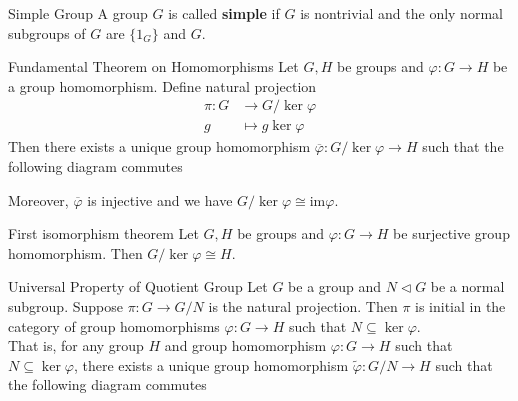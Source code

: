 \begin{definition}{Simple Group}{}
    A group $G$ is called \textbf{simple} if $G$ is nontrivial and the only normal subgroups of $G$ are $\{1_G\}$ and $G$.
\end{definition}

\begin{theorem}{Fundamental Theorem on Homomorphisms}{}
    Let $G,H$ be groups and $\varphi:G\to H$ be a group homomorphism. Define natural projection
    \begin{align*}
        \pi:G & \longrightarrow G/\ker\varphi \\
        g     & \longmapsto g\ker\varphi
    \end{align*}
    Then there exists a unique group homomorphism $\overline{\varphi}:G/\ker\varphi\to H$ such that the following diagram commutes
    \begin{center}
    \end{center}
    Moreover, $\overline{\varphi}$ is injective and we have $ G/\ker\varphi\cong \mathrm{im}\varphi$.
\end{theorem}

\begin{corollary}{First isomorphism theorem}{}
    Let $G,H$ be groups and $\varphi:G\to H$ be surjective group homomorphism. Then $G/\ker\varphi\cong H$.
\end{corollary}


\begin{proposition}{Universal Property of Quotient Group}{}
    Let $G$ be a group and $N \lhd G$ be a normal subgroup. Suppose $\pi:G\to G/N$ is the natural projection. Then $\pi$ is initial in the category of group homomorphisms $\varphi:G\to H$ such that $N\subseteq \ker\varphi$. \\
    That is, for any group $H$ and group homomorphism $\varphi:G\to H$ such that $N\subseteq \ker\varphi$, there exists a unique group homomorphism $\widetilde{\varphi}:G/N\to H$ such that the following diagram commutes
    \begin{center}
    \end{center}
\end{proposition}

